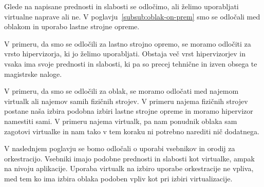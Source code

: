 \noindent Glede na napisane prednosti in slabosti se odločimo,
ali želimo uporabljati virtualne naprave ali ne.
V poglavju~\ref{subsub:oblak-on-prem} smo se odločali med oblakom in
uporabo lastne strojne opreme.

V primeru, da smo se odločili za lastno strojno opremo,
se moramo odločiti za vrsto hipervizorja,
ki jo želimo uporabljati.
Obstaja več vrst hipervizorjev in vsaka ima svoje prednosti
in slabosti, ki pa so precej tehnične in izven obsega te magistrske naloge.

V primeru, da smo se odločili za oblak,
se moramo odločati med najemom virtualk ali najemov samih fizičnih strojev.
V primeru najema fizičnih strojev postane naša izbira podobna izbiri
lastne strojne opreme in moramo hipervizor namestiti sami.
V primeru najema virtualk, pa nam ponudnik oblaka sam zagotovi
virtualke in nam tako v tem koraku ni potrebno narediti nič dodatnega.

V naslednjem poglavju se bomo odločali o uporabi vsebnikov in
orodij za orkestracijo.
Vsebniki imajo podobne prednosti in slabosti kot
virtualke, ampak na nivoju aplikacije.
Uporaba virtualk na izbiro uporabe orkestracije ne vpliva,
med tem ko ima izbira oblaka podoben vpliv kot pri
izbiri virtualizacije.